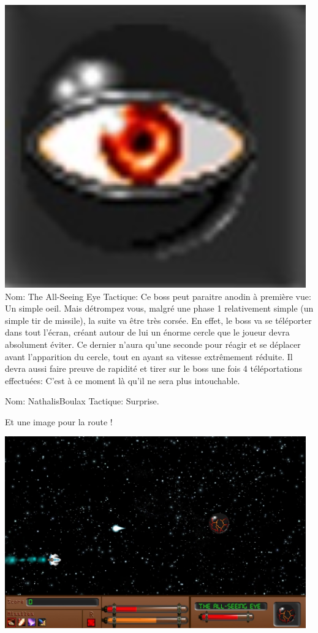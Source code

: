 \par \includegraphics[width=13cm]{images/boss45.jpg} Nom: The All-Seeing Eye
				Tactique: Ce boss peut paraitre anodin à première vue: Un simple oeil. Mais détrompez vous, malgré une phase 1 relativement simple (un simple tir de missile), la suite va être très corsée. En effet, le boss va se téléporter dans tout l'écran, créant autour de lui un énorme cercle que le joueur devra absolument éviter. Ce dernier n'aura qu'une seconde pour réagir et se déplacer avant l'apparition du cercle, tout en ayant sa vitesse extrêmement réduite. Il devra aussi faire preuve de rapidité et tirer sur le boss une fois 4 téléportations effectuées: C'est à ce moment là qu'il ne sera plus intouchable.
				
			    Nom: NathalisBoulax
				Tactique: Surprise.
				
\par Et une image pour la route !
\par \includegraphics[width=13cm]{images/boss42.jpg}
